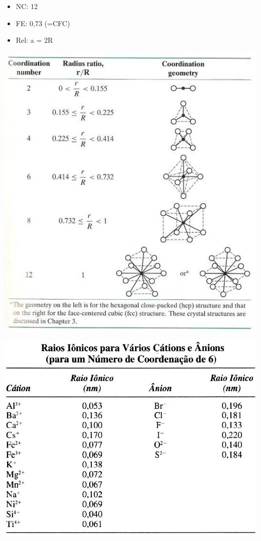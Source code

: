 \begin{itemize}
	
	\setlength{\parskip}{0pt}
	\setlength{\itemsep}{0pt plus 1pt}
	
	\item NC: 12
	\item FE: 0,73 (=CFC)
	\item Rel: a = 2R
\end{itemize}


 \includegraphics[scale=0.3,trim={0 0 0 0}]{figures/RELraio}
 
 
 \includegraphics[scale=0.2,trim={0 0 0 0}]{figures/raio}
 


